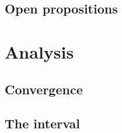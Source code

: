 \documentclass{../util/zariski-small}
\begin{document}
\subsection{Open propositions}


\section{Analysis}

\subsection{Convergence}



\subsection{The interval}
%


\printbibliography
\end{document}
